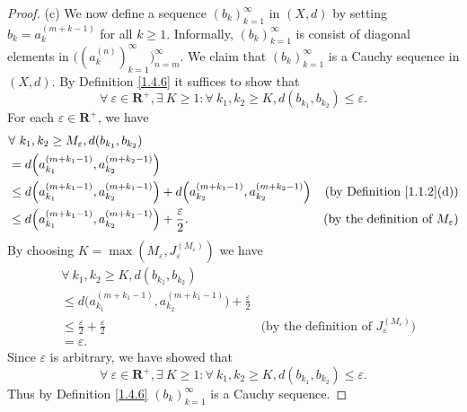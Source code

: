 \begin{proof}{(c)}
    We now define a sequence \((b_k)_{k = 1}^\infty\) in \((X, d)\) by setting \(b_k = a_k^{(m + k - 1)}\) for all \(k \geq 1\).
    Informally, \((b_k)_{k = 1}^\infty\) is consist of diagonal elements in \(\big((a_k^{(n)})_{k = 1}^\infty\big)_{n = m}^\infty\).
    We claim that \((b_k)_{k = 1}^\infty\) is a Cauchy sequence in \((X, d)\).
    By Definition \ref{1.4.6} it suffices to show that
    \[
        \forall\ \varepsilon \in \mathbf{R}^+, \exists\ K \geq 1 : \forall\ k_1, k_2 \geq K, d(b_{k_1}, b_{k_2}) \leq \varepsilon.
    \]
    For each \(\varepsilon \in \mathbf{R}^+\), we have
    \begin{align*}
         & \forall\ k_1, k_2 \geq M_\varepsilon, d(b_{k_1}, b_{k_2})                                                                                                                        \\
         & = d\Big(a_{k_1}^{(m + k_1 - 1)}, a_{k_2}^{(m + k_2 - 1)}\Big)                                                                                                                    \\
         & \leq d\Big(a_{k_1}^{(m + k_1 - 1)}, a_{k_2}^{(m + k_1 - 1)}\Big) + d\Big(a_{k_2}^{(m + k_1 - 1)}, a_{k_2}^{(m + k_2 - 1)}\Big) & \text{(by Definition \ref{1.1.2}(d))}           \\
         & \leq d\Big(a_{k_1}^{(m + k_1 - 1)}, a_{k_2}^{(m + k_1 - 1)}\Big) + \frac{\varepsilon}{2}.                                      & \text{(by the definition of \(M_\varepsilon\))}
    \end{align*}
    By choosing \(K = \max(M_\varepsilon, J_\varepsilon^{(M_\varepsilon)})\) we have
    \begin{align*}
         & \forall\ k_1, k_2 \geq K, d(b_{k_1}, b_{k_2})                                                                                                                \\
         & \leq d\Big(a_{k_1}^{(m + k_1 - 1)}, a_{k_2}^{(m + k_1 - 1)}\Big) + \frac{\varepsilon}{2}                                                                     \\
         & \leq \frac{\varepsilon}{2} + \frac{\varepsilon}{2}                                       & \text{(by the definition of \(J_\varepsilon^{(M_\varepsilon)}\))} \\
         & = \varepsilon.
    \end{align*}
    Since \(\varepsilon\) is arbitrary, we have showed that
    \[
        \forall\ \varepsilon \in \mathbf{R}^+, \exists\ K \geq 1 : \forall\ k_1, k_2 \geq K, d(b_{k_1}, b_{k_2}) \leq \varepsilon.
    \]
    Thus by Definition \ref{1.4.6} \((b_k)_{k = 1}^\infty\) is a Cauchy sequence.


\end{proof}
